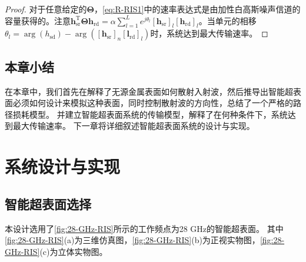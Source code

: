 \documentclass[supercite]{HustGraduPaper}
\begin{document}
\begin{proof}
	对于任意给定的$\boldsymbol{\Theta}$，\autoref{eq:R-RIS1}中的速率表达式是由加性白高斯噪声信道的容量获得的。注意$ \mathbf{h}_{\mathrm{sr}}^{\mathrm{T}} \boldsymbol{\Theta} \mathbf{h}_{\mathrm{rd}} = \alpha \sum_{l=1}^{L} e^{j\theta_l} \left[\mathbf{h}_{\mathrm{sr}}\right]_{l}\left[\mathbf{h}_{\mathrm{rd}}\right]_{l} $。当单元的相移$\theta_{l}=\arg \left(h_{\mathrm{sd}}\right)-\arg \left(\left[\mathbf{h}_{\mathrm{sr}}\right]_{n}\left[\mathbf{l}_{\mathrm{rd}}\right]_{l}\right)$时，系统达到最大传输速率。
\end{proof}

\subsection{本章小结}

在本章中，我们首先在解释了无源金属表面如何散射入射波，然后推导出智能超表面必须如何设计来模拟这种表面，同时控制散射波的方向性，总结了一个严格的路径损耗模型。
并建立智能超表面系统的传输模型，解释了在何种条件下，系统达到最大传输速率。
下一章将详细叙述智能超表面系统的设计与实现。

\section{系统设计与实现}\label{sec:design}

\subsection{智能超表面选择}\label{subsec:28-GHz-RIS}

本设计选用了\autoref{fig:28-GHz-RIS}所示的工作频点为28 GHz的智能超表面。
其中\autoref{fig:28-GHz-RIS}(a)为三维仿真图，\autoref{fig:28-GHz-RIS}(b)为正视实物图，\autoref{fig:28-GHz-RIS}(c)为立体实物图。
\end{document}
